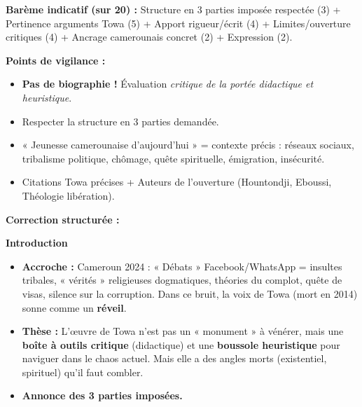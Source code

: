 \documentclass[11pt]{article}
\begin{document}
\begin{corrige}
\textbf{Barème indicatif (sur 20) :} Structure en 3 parties imposée respectée (3) + Pertinence arguments Towa (5) + Apport rigueur/écrit (4) + Limites/ouverture critiques (4) + Ancrage camerounais concret (2) + Expression (2).

\textbf{Points de vigilance :}
\begin{itemize}
\item \textbf{Pas de biographie !} Évaluation \emph{critique de la portée didactique et heuristique}.
\item Respecter la structure en 3 parties demandée.
\item « Jeunesse camerounaise d'aujourd'hui » = contexte précis : réseaux sociaux, tribalisme politique, chômage, quête spirituelle, émigration, insécurité.
\item Citations Towa précises + Auteurs de l'ouverture (Hountondji, Eboussi, Théologie libération).
\end{itemize}

\textbf{Correction structurée :}

\textbf{Introduction}
\begin{itemize}
\item \textbf{Accroche :} Cameroun 2024 : « Débats » Facebook/WhatsApp = insultes tribales, « vérités » religieuses dogmatiques, théories du complot, quête de visas, silence sur la corruption. Dans ce bruit, la voix de Towa (mort en 2014) sonne comme un \textbf{réveil}.
\item \textbf{Thèse :} L'œuvre de Towa n'est pas un « monument » à vénérer, mais une \textbf{boîte à outils critique} (didactique) et une \textbf{boussole heuristique} pour naviguer dans le chaos actuel. Mais elle a des angles morts (existentiel, spirituel) qu'il faut combler.
\item \textbf{Annonce des 3 parties imposées.}
\end{itemize}


\end{corrige}
\end{document}
